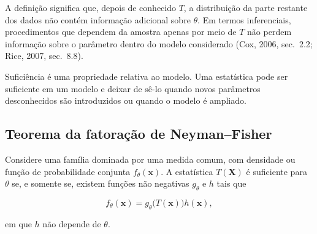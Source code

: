 \documentclass[
  letterpaper,
  DIV=11,
  numbers=noendperiod]{scrreprt}
\begin{document}
A definição significa que, depois de conhecido \(T\), a distribuição da
parte restante dos dados não contém informação adicional sobre
\(\theta\). Em termos inferenciais, procedimentos que dependem da
amostra apenas por meio de \(T\) não perdem informação sobre o parâmetro
dentro do modelo considerado (Cox, 2006, sec.~2.2; Rice, 2007,
sec.~8.8).

\begin{tcolorbox}[enhanced jigsaw, colback=white, leftrule=.75mm, colbacktitle=quarto-callout-warning-color!10!white, breakable, titlerule=0mm, bottomtitle=1mm, title=\textcolor{quarto-callout-warning-color}{\faExclamationTriangle}\hspace{0.5em}{Observação}, colframe=quarto-callout-warning-color-frame, toprule=.15mm, opacityback=0, bottomrule=.15mm, opacitybacktitle=0.6, arc=.35mm, toptitle=1mm, rightrule=.15mm, coltitle=black, left=2mm]

Suficiência é uma propriedade relativa ao modelo. Uma estatística pode
ser suficiente em um modelo e deixar de sê-lo quando novos parâmetros
desconhecidos são introduzidos ou quando o modelo é ampliado.

\end{tcolorbox}

\subsection*{Teorema da fatoração de
Neyman--Fisher}\label{teorema-da-fatorauxe7uxe3o-de-neymanfisher}

\begin{tcolorbox}[enhanced jigsaw, colback=white, leftrule=.75mm, colbacktitle=quarto-callout-important-color!10!white, breakable, titlerule=0mm, bottomtitle=1mm, title=\textcolor{quarto-callout-important-color}{\faExclamation}\hspace{0.5em}{Teorema --- Fatoração de Neyman--Fisher}, colframe=quarto-callout-important-color-frame, toprule=.15mm, opacityback=0, bottomrule=.15mm, opacitybacktitle=0.6, arc=.35mm, toptitle=1mm, rightrule=.15mm, coltitle=black, left=2mm]

Considere uma família dominada por uma medida comum, com densidade ou
função de probabilidade conjunta \(f_\theta(\mathbf{x})\). A estatística
\(T(\mathbf{X})\) é suficiente para \(\theta\) se, e somente se, existem
funções não negativas \(g_\theta\) e \(h\) tais que

\[f_\theta(\mathbf{x})
=
g_\theta\bigl(T(\mathbf{x})\bigr)h(\mathbf{x}),\]

em que \(h\) não depende de \(\theta\).

\end{tcolorbox}
\end{document}
